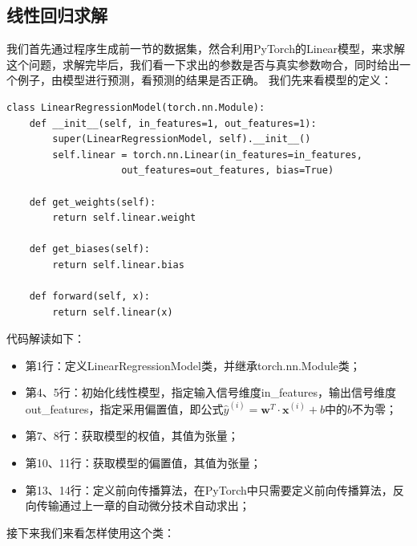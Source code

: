 \documentclass[UTF8]{article}
\begin{document}
\subsection{线性回归求解}
我们首先通过程序生成前一节的数据集，然合利用PyTorch的Linear模型，来求解这个问题，求解完毕后，我们看一下求出的参数是否与真实参数吻合，同时给出一个例子，由模型进行预测，看预测的结果是否正确。\newline
我们先来看模型的定义：
\begin{lstlisting}
class LinearRegressionModel(torch.nn.Module):
    def __init__(self, in_features=1, out_features=1):
        super(LinearRegressionModel, self).__init__()
        self.linear = torch.nn.Linear(in_features=in_features, 
                    out_features=out_features, bias=True)

    def get_weights(self):
        return self.linear.weight
    
    def get_biases(self):
        return self.linear.bias

    def forward(self, x):
        return self.linear(x)
\end{lstlisting}
代码解读如下：
\begin{itemize}
\item 第1行：定义LinearRegressionModel类，并继承torch.nn.Module类；
\item 第4、5行：初始化线性模型，指定输入信号维度in\_features，输出信号维度out\_features，指定采用偏置值，即公式$\hat{y}^{(i)}=\boldsymbol{w}^{T} \cdot \boldsymbol{x}^{(i)} + b$中的$b$不为零；
\item 第7、8行：获取模型的权值，其值为张量；
\item 第10、11行：获取模型的偏置值，其值为张量；
\item 第13、14行：定义前向传播算法，在PyTorch中只需要定义前向传播算法，反向传输通过上一章的自动微分技术自动求出；
\end{itemize}
接下来我们来看怎样使用这个类：
\end{document}

